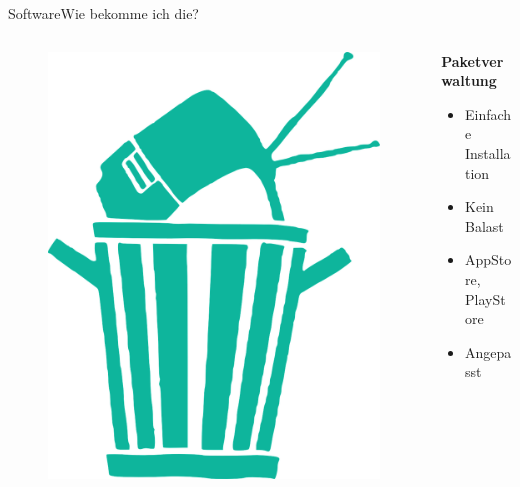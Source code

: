  \begin{frame}{Software}{Wie bekomme ich die?}

  \begin{columns}
  \begin{column}{0.3\textwidth}
 \begin{figure}
 \includegraphics[height=0.5\textheight]{resources/garbage-296550_1280.png}
 \end{figure}
\end{column}
\begin{column}{0.6\textwidth}
 \begin{center}
   \textbf{\large{ Paketverwaltung}}
 \end{center}

  \begin{itemize}
   \item Einfache Installation 
   \item Kein Balast 
   \item AppStore, PlayStore   
   \item Angepasst 
  \end{itemize}

  \end{column}
  \end{columns}
 \end{frame}

